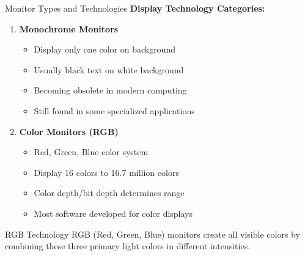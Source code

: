 \documentclass[aspectratio=169]{beamer}
\begin{document}
\begin{frame}{Monitor Types and Technologies}
    \textbf{Display Technology Categories:}
    
    \begin{enumerate}
        \item \textbf{Monochrome Monitors}
        \begin{itemize}
            \item Display only one color on background
            \item Usually black text on white background
            \item Becoming obsolete in modern computing
            \item Still found in some specialized applications
        \end{itemize}
        
        \item \textbf{Color Monitors (RGB)}
        \begin{itemize}
            \item Red, Green, Blue color system
            \item Display 16 colors to 16.7 million colors
            \item Color depth/bit depth determines range
            \item Most software developed for color displays
        \end{itemize}
    \end{enumerate}
    
    \vspace{0.5cm}
    \begin{exampleblock}{RGB Technology}
        RGB (Red, Green, Blue) monitors create all visible colors by combining these three primary light colors in different intensities.
    \end{exampleblock}
\end{frame}
\end{document}
